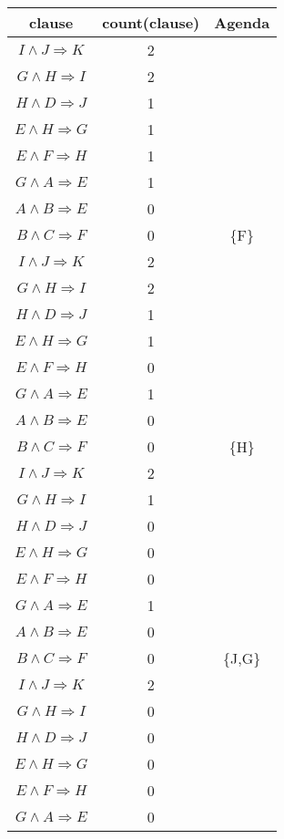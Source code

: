 \documentclass[12pt]{article}
\begin{document}
\begin{table}[H]
\small
\centering
\label{table:example}
\begin{tabular}
{|c|c|c|}	%
\hline 							%
\textbf{clause} & \textbf{count(clause)} & \textbf{Agenda}\\
\hline
$I \wedge J \Rightarrow K$ & 2 &\\
$G \wedge H \Rightarrow I$ & 2 &\\
$H \wedge D \Rightarrow J$ & 1 &\\
$E \wedge H \Rightarrow G$ & 1 &\\
$E \wedge F \Rightarrow H$ & 1 &\\
$G \wedge A \Rightarrow E$ & 1 &\\
$A \wedge B \Rightarrow E$ & 0 &\\
$B \wedge C \Rightarrow F$ & 0 & \{F\}\\
\hline
$I \wedge J \Rightarrow K$ & 2 &\\
$G \wedge H \Rightarrow I$ & 2 &\\
$H \wedge D \Rightarrow J$ & 1 &\\
$E \wedge H \Rightarrow G$ & 1 &\\
$E \wedge F \Rightarrow H$ & 0 &\\
$G \wedge A \Rightarrow E$ & 1 &\\
$A \wedge B \Rightarrow E$ & 0 &\\
$B \wedge C \Rightarrow F$ & 0 & \{H\}\\
\hline
$I \wedge J \Rightarrow K$ & 2 &\\
$G \wedge H \Rightarrow I$ & 1 &\\
$H \wedge D \Rightarrow J$ & 0 &\\
$E \wedge H \Rightarrow G$ & 0 &\\
$E \wedge F \Rightarrow H$ & 0 &\\
$G \wedge A \Rightarrow E$ & 1 &\\
$A \wedge B \Rightarrow E$ & 0 &\\
$B \wedge C \Rightarrow F$ & 0 & \{J,G\}\\
\hline
$I \wedge J \Rightarrow K$ & 2 &\\
$G \wedge H \Rightarrow I$ & 0 &\\
$H \wedge D \Rightarrow J$ & 0 &\\
$E \wedge H \Rightarrow G$ & 0 &\\
$E \wedge F \Rightarrow H$ & 0 &\\
$G \wedge A \Rightarrow E$ & 0 &\\

\end{tabular}
\end{table}
\end{document}
